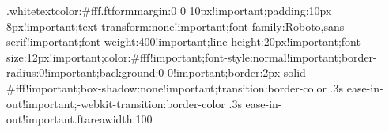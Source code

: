 {{{{{{.whitetext{color:#fff}.ftform{margin:0 0 10px!important;padding:10px 8px!important;text-transform:none!important;font-family:Roboto,sans-serif!important;font-weight:400!important;line-height:20px!important;font-size:12px!important;color:#fff!important;font-style:normal!important;border-radius:0!important;background:0 0!important;border:2px solid #fff!important;box-shadow:none!important;transition:border-color .3s ease-in-out!important;-webkit-transition:border-color .3s ease-in-out!important}.ftarea{width:100%
}}}}}}}
